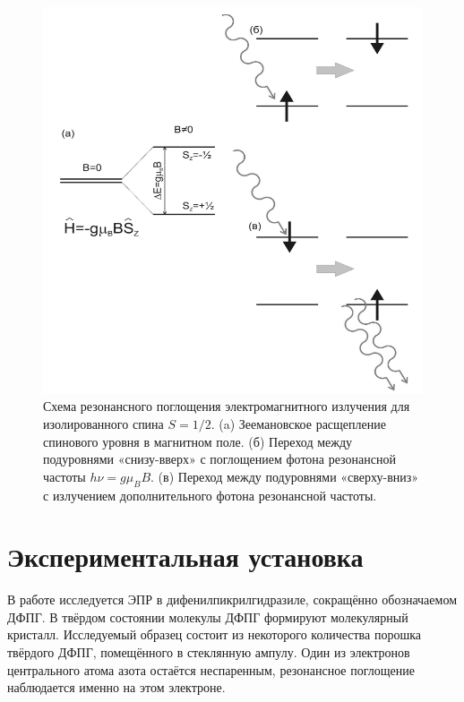 \documentclass[14pt, a4paper]{report}
\begin{document}
\begin{figure}[H]
\centering
\includegraphics[width=.8\linewidth]{../images/5101-2}
\caption{Схема резонансного поглощения электромагнитного излучения для изолированного спина $S=1/2$. (a) Зеемановское расщепление спинового уровня в магнитном поле. (б) Переход между подуровнями «снизу-вверх» с поглощением фотона резонансной частоты $h\nu=g\mu_B B$. (в) Переход между подуровнями «сверху-вниз» с излучением дополнительного фотона резонансной частоты.}
\end{figure}

\section{Экспериментальная установка}

В работе исследуется ЭПР в дифенилпикрилгидразиле, сокращённо обозначаемом ДФПГ. В твёрдом состоянии молекулы ДФПГ формируют молекулярный кристалл. Исследуемый образец состоит из некоторого количества порошка твёрдого ДФПГ, помещённого в стеклянную ампулу. Один из электронов центрального атома азота остаётся неспаренным, резонансное поглощение наблюдается именно на этом электроне.
\end{document}
